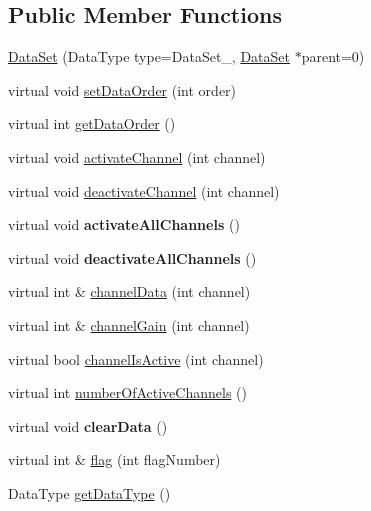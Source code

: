 \subsection*{Public Member Functions}
\begin{DoxyCompactItemize}
\item 
\hyperlink{classDataSet_add582898d638653c323b04b8747e23f0}{Data\+Set} (Data\+Type type=Data\+Set\+\_, \hyperlink{classDataSet}{Data\+Set} $\ast$parent=0)
\item 
virtual void \hyperlink{classDataSet_a4d3cdc4163a6df9860da8fd77be53380}{set\+Data\+Order} (int order)
\item 
virtual int \hyperlink{classDataSet_a96b0344b1c0177389288559b6968fb06}{get\+Data\+Order} ()
\item 
virtual void \hyperlink{classDataSet_a834f924af9e0331f1fbda00e3c994659}{activate\+Channel} (int channel)
\item 
virtual void \hyperlink{classDataSet_a4bd82cb866f395b14e6c370ed6750044}{deactivate\+Channel} (int channel)
\item 
\hypertarget{classDataSet_a51059276326b2d21458eb1e2b979ad06}{virtual void {\bfseries activate\+All\+Channels} ()}\label{classDataSet_a51059276326b2d21458eb1e2b979ad06}

\item 
\hypertarget{classDataSet_a17824b7103e546c40fbe83f93a5dfc6a}{virtual void {\bfseries deactivate\+All\+Channels} ()}\label{classDataSet_a17824b7103e546c40fbe83f93a5dfc6a}

\item 
virtual int \& \hyperlink{classDataSet_a9714f8ca542300f722b5f1ae802ab2fa}{channel\+Data} (int channel)
\item 
virtual int \& \hyperlink{classDataSet_adb6471efd6fe3f9bbcbf5df5a2c527a0}{channel\+Gain} (int channel)
\item 
virtual bool \hyperlink{classDataSet_aa7e7790945a346a7c8db46b360d9febf}{channel\+Is\+Active} (int channel)
\item 
virtual int \hyperlink{classDataSet_a7f26dba838ee5b5ad03cab51676d8162}{number\+Of\+Active\+Channels} ()
\item 
\hypertarget{classDataSet_a90dbe67f61080c32ab770c6173806b07}{virtual void {\bfseries clear\+Data} ()}\label{classDataSet_a90dbe67f61080c32ab770c6173806b07}

\item 
virtual int \& \hyperlink{classDataSet_a8b3ab62f1de202b5163bb02dd84f22af}{flag} (int flag\+Number)
\item 
Data\+Type \hyperlink{classDataSet_ac03684e5474ecf5d08e507f7709b5f87}{get\+Data\+Type} ()
\end{DoxyCompactItemize}


